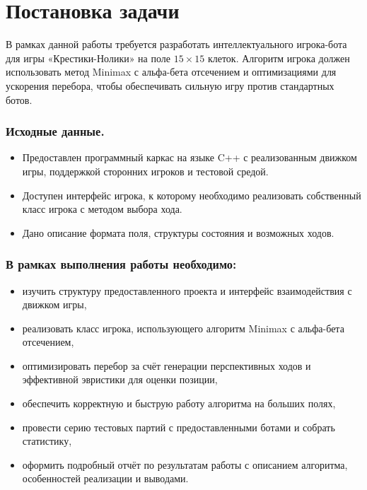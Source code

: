 \section{Постановка задачи}

В рамках данной работы требуется разработать интеллектуального игрока-бота для игры «Крестики-Нолики» на поле $15\times15$ клеток. Алгоритм игрока должен использовать метод Minimax с альфа-бета отсечением и оптимизациями для ускорения перебора, чтобы обеспечивать сильную игру против стандартных ботов.

\subsubsection*{Исходные данные.}
\begin{itemize}
    \item Предоставлен программный каркас на языке C++ с реализованным движком игры, поддержкой сторонних игроков и тестовой средой.
    \item Доступен интерфейс игрока, к которому необходимо реализовать собственный класс игрока с методом выбора хода.
    \item Дано описание формата поля, структуры состояния и возможных ходов.
\end{itemize}

\subsubsection*{В рамках выполнения работы необходимо:}
\begin{itemize}
    \item изучить структуру предоставленного проекта и интерфейс взаимодействия с движком игры,
    \item реализовать класс игрока, использующего алгоритм Minimax с альфа-бета отсечением,
    \item оптимизировать перебор за счёт генерации перспективных ходов и эффективной эвристики для оценки позиции,
    \item обеспечить корректную и быструю работу алгоритма на больших полях,
    \item провести серию тестовых партий с предоставленными ботами и собрать статистику,
    \item оформить подробный отчёт по результатам работы с описанием алгоритма, особенностей реализации и выводами.
\end{itemize}